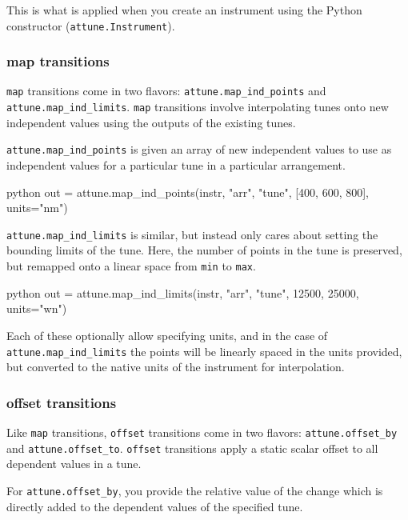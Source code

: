 This is what is applied when you create an instrument using the Python
constructor (\texttt{attune.Instrument}).

\hypertarget{map-transitions}{%
\subsubsection{map transitions}\label{map-transitions}}

\texttt{map} transitions come in two flavors:
\texttt{attune.map\_ind\_points} and \texttt{attune.map\_ind\_limits}.
\texttt{map} transitions involve interpolating tunes onto new
independent values using the outputs of the existing tunes.

\texttt{attune.map\_ind\_points} is given an array of new independent
values to use as independent values for a particular tune in a
particular arrangement.

\begin{codefragment}{python}
out = attune.map_ind_points(instr, "arr", "tune", [400, 600, 800], units="nm")
\end{codefragment}

\texttt{attune.map\_ind\_limits} is similar, but instead only cares
about setting the bounding limits of the tune. Here, the number of
points in the tune is preserved, but remapped onto a linear space from
\texttt{min} to \texttt{max}.

\begin{codefragment}{python}
out = attune.map_ind_limits(instr, "arr", "tune", 12500, 25000, units="wn")
\end{codefragment}

Each of these optionally allow specifying units, and in the case of
\texttt{attune.map\_ind\_limits} the points will be linearly spaced in
the units provided, but converted to the native units of the instrument
for interpolation.

\hypertarget{offset-transitions}{%
\subsubsection{offset transitions}\label{offset-transitions}}

Like \texttt{map} transitions, \texttt{offset} transitions come in two
flavors: \texttt{attune.offset\_by} and \texttt{attune.offset\_to}.
\texttt{offset} transitions apply a static scalar offset to all
dependent values in a tune.

For \texttt{attune.offset\_by}, you provide the relative value of the
change which is directly added to the dependent values of the specified
tune.

